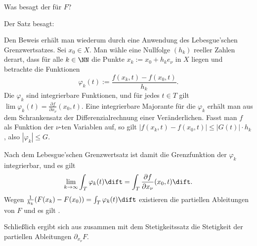 \begin{frage}\label{11_paramdifferenzierbarkeit}
  Was besagt der  für $F$?
\end{frage}

\begin{antwort}
  Der Satz besagt:

  \medskip\noindent 
  \noindent
  Den Beweis erhält man wiederum durch eine Anwendung des Lebesgue'schen 
  Grenzwertsatzes. Sei $x_0 \in X$. Man wähle eine Nullfolge 
  $(h_k)$ reeller Zahlen derart, dass für alle $k\in\NN$ 
  die Punkte $x_k := x_0 + h_k e_\nu$ in $X$ liegen und betrachte die 
  Funktionen 
  \[
  \varphi_k (t) := \frac{f(x_k,t)-f(x_0,t)}{h_k}.
  \]
  Die $\varphi_k$ sind integrierbare Funktionen, und für jedes $t\in T$ gilt 
  $\lim\varphi_k (t) = \frac{\partial f}{\partial x_\nu} 
  (x_0,t)$. 
  Eine integrierbare Majorante für die $\varphi_k$ erhält man aus dem
  Schrankensatz der Differenzialrechnung einer Veränderlichen. Fasst man 
  $f$ als Funktion der $\nu$-ten Variablen auf, so gilt 
  $| f(x_k,t)-f(x_0,t) | \le \big| G(t) \big| \cdot h_k$,  
  also $| \varphi_k | \le G$. 

  Nach dem Lebesgue'schen Grenzwertsatz ist damit die 
  Grenzfunktion der $\varphi_k$ integrierbar, und es gilt 
  \[
  \lim_{k\to\infty} \int_T \varphi_k (t)\dift = 
  \int_T \frac{\partial f}{\partial x_\nu} (x_0,t) \dift.
  \]
  Wegen $
  \frac{1}{h_k}( F(x_k)-F(x_0) ) = \int_T \varphi_k (t)\dift$ 
  existieren die partiellen Ableitungen von $F$ und es gilt 
  {\astastref}.
  
  Schließlich ergibt sich aus {\astastref} zusammen mit dem Stetigkeitssatz 
  die Stetigkeit der partiellen Ableitungen $\partial_{x_\nu} F$. 
  \AntEnd
\end{antwort} 


